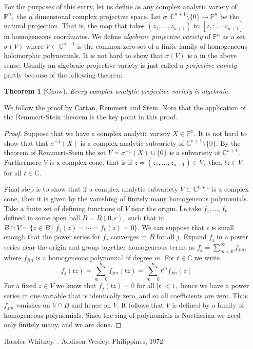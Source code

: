 \documentclass[12pt]{article}
\theoremstyle{theorem}
\newtheorem*{thm}{Theorem}
\theoremstyle{definition}
\theoremstyle{remark}
\begin{document}
For the purposes of this entry, let us define  as
any complex analytic variety of ${\mathbb P}^n,$ the $n$ dimensional
complex projective space.
Let $\sigma \colon {\mathbb C}^{n+1} \setminus \{0\} \to {\mathbb P}^n$ be the natural projection.  That is,
the map that takes $(z_1,\ldots,z_{n+1})$ to $[z_1:\ldots:z_{n+1}]$ in homogeneous coordinates.
We define \emph{algebraic projective variety} of ${\mathbb P}^n$ as a set $\sigma(V)$
where $V \subset {\mathbb C}^{n+1}$ is the common zero set of 
a finite family of homogeneous holomorphic polynomials.  It is not hard to show that $\sigma(V)$
is a  in the above sense.  Usually an algebraic
projective variety is just called a \emph{projective variety} partly because of the following theorem.

\begin{thm}[Chow]
Every complex analytic projective variety is algebraic.
\end{thm}

We follow the proof by Cartan, Remmert and Stein.  Note that the application of the Remmert-Stein theorem
is the key point in this proof.

\begin{proof}
Suppose that we have a complex analytic variety $X \in {\mathbb P}^n$.  It is not hard to show that
that $\sigma^{-1}(X)$ is a complex analytic subvariety of ${\mathbb C}^{n+1} \setminus \{0\}.$  By 
the theorem of Remmert-Stein the set $V = \sigma^{-1}(X) \cup \{0\}$ is a subvariety of ${\mathbb C}^{n+1}.$
Furthermore $V$ is a complex cone, that is if $z = (z_1,\ldots,z_{n+1}) \in V,$ then $t z \in V$ for all
$t \in {\mathbb C}.$

Final step is to show that if a complex analytic subvariety $V \subset {\mathbb C}^{n+1}$ is a complex cone,
then it is given by the vanishing of finitely many homogeneous polynomials.
Take a finite set of defining functions of $V$ near the origin.  I.e.\@ take $f_1,\ldots,f_k$
defined in some open ball $B = B(0,\epsilon),$ such that in 
$B \cap V = \{ z \in B \mid f_1(z) = \cdots = f_k(z) = 0 \}.$  We can suppose that $\epsilon$
is small enough that the power series for $f_j$ converges in $B$ for all $j.$
Expand $f_j$ in a power series near the origin and group together
homogeneous terms as $f_j = \sum_{m=0}^\infty f_{jm}$, where $f_{jm}$ is a homogeneous polynomial of
degree $m.$  For $t \in {\mathbb C}$ we write
\begin{equation*}
f_j(t z) = \sum_{m=0}^\infty f_{jm}(tz) = \sum_{m=0}^\infty t^m f_{jm}(z)
\end{equation*}
For a fixed $z \in V$ we know that $f_{j}(t z) = 0$ for all $\lvert t \rvert < 1,$ hence we have a power series
in one variable that is identically zero, and so all coefficients are zero.
Thus $f_{jm}$ vanishes on $V \cap B$ and hence on $V.$  It follows that
$V$ is defined by a family of homogeneous polynomials.  Since the ring of polynomials is Noetherian we need only
finitely many, and we are done.
\end{proof}

\begin{thebibliography}{9}
Hassler Whitney.
{\em {}}.
Addison-Wesley, Philippines, 1972.
\end{thebibliography}

\end{document}
